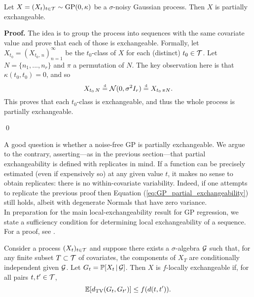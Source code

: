 \begin{proposition}
	Let $X = (X_t)_{t \in \mathcal{T}} \sim \mathrm{GP} (0, \kappa)$ be a $\sigma$-noisy Gaussian process. Then $X$ is partially exchangeable.
\end{proposition}

\textbf{Proof. \hspace{0.05cm}} The idea is to group the process into sequences with the same covariate value and prove that each of those is exchangeable. Formally, let $X_{t_0} = (X_{t_0, \, n})_{n=1}^{\infty}$ be the $t_0$-class of $X$ for each (distinct) $t_0 \in \mathcal{T}$. Let $N = \{n_1, ..., n_r \}$ and $\pi$ a permutation of $N$. The key observation here is that $\kappa(t_0, t_0) = 0$, and so
\begin{equation} \label{eq:GP_partial_exchangeability}
	X_{t_0 \, N} \stackrel{\text{\rm\tiny d}}{=} \mathcal{N} (0, \sigma^2 I_r) \stackrel{\text{\rm\tiny d}}{=} X_{t_0 \, \pi N}.
\end{equation}
This proves that each $t_0$-class is exchangeable, and thus the whole process is partially exchangeable.

\qed

\vskip 0.2cm

A good question is whether a noise-free GP is partially exchangeable. We argue to the contrary, asserting---as in the previous section---that partial exchangeability is defined with replicates in mind. If a function can be precisely estimated (even if expensively so) at any given value $t$, it makes no sense to obtain replicates: there is no within-covariate variability. Indeed, if one attempts to replicate the previous proof then Equation (\ref{eq:GP_partial_exchangeability}) still holds, albeit with degenerate Normals that have zero variance. \\



In preparation for the main local-exchangeability result for GP regression, we state a sufficiency condition for determining local exchangeability of a sequence. For a proof, see \cite[][Proposition 3]{CampbellEtAl:2019:LocalExch}.

\begin{proposition} \label{prop:sufficient_local_exchangeability}
	Consider a process $(X_t)_{t \in \mathcal{T}}$ and suppose there exists a $\sigma$-algebra $\mathcal{G}$ such that, for any finite subset $T \subset \mathcal{T}$ of covariates, the components of $X_T$ are conditionally independent given $\mathcal{G}$. Let $G_t = \mathbb{P} [X_t \, | \, \mathcal{G} ]$. Then $X$ is $f$-locally exchangeable if, for all pairs $t, t' \in \mathcal{T}$,
	\begin{equation} \label{eq:sufficient_local_exchangeability}
		\mathbb{E}[d_{\mathrm{TV}} (G_t , G_{t'} ) ] \leq f(d(t, t')).
	\end{equation}
\end{proposition}


